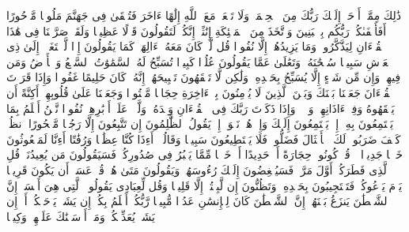 \stopbuffer%
\startbuffer[\q:17:39]
ذَٰلِكَ مِمَّاۤ أَوۡحَىٰۤ إِلَیۡكَ رَبُّكَ مِنَ ٱلۡحِكۡمَةِۗ وَلَا تَجۡعَلۡ مَعَ ٱللَّهِ إِلَٰهًا ءَاخَرَ فَتُلۡقَىٰ فِی جَهَنَّمَ مَلُومࣰا مَّدۡحُورًا%
\stopbuffer%
\startbuffer[\q:17:40]
أَفَأَصۡفَىٰكُمۡ رَبُّكُم بِٱلۡبَنِینَ وَٱتَّخَذَ مِنَ ٱلۡمَلَٰۤئِكَةِ إِنَٰثًاۚ إِنَّكُمۡ لَتَقُولُونَ قَوۡلًا عَظِیمࣰا%
\stopbuffer%
\startbuffer[\q:17:41]
وَلَقَدۡ صَرَّفۡنَا فِی هَٰذَا ٱلۡقُرۡءَانِ لِیَذَّكَّرُوا۟ وَمَا یَزِیدُهُمۡ إِلَّا نُفُورࣰا%
\stopbuffer%
\startbuffer[\q:17:42]
قُل لَّوۡ كَانَ مَعَهُۥۤ ءَالِهَةࣱ كَمَا یَقُولُونَ إِذࣰا لَّٱبۡتَغَوۡا۟ إِلَىٰ ذِی ٱلۡعَرۡشِ سَبِیلࣰا%
\stopbuffer%
\startbuffer[\q:17:43]
سُبۡحَٰنَهُۥ وَتَعَٰلَىٰ عَمَّا یَقُولُونَ عُلُوࣰّا كَبِیرࣰا%
\stopbuffer%
\startbuffer[\q:17:44]
تُسَبِّحُ لَهُ ٱلسَّمَٰوَٰتُ ٱلسَّبۡعُ وَٱلۡأَرۡضُ وَمَن فِیهِنَّۚ وَإِن مِّن شَیۡءٍ إِلَّا یُسَبِّحُ بِحَمۡدِهِۦ وَلَٰكِن لَّا تَفۡقَهُونَ تَسۡبِیحَهُمۡۚ إِنَّهُۥ كَانَ حَلِیمًا غَفُورࣰا%
\stopbuffer%
\startbuffer[\q:17:45]
وَإِذَا قَرَأۡتَ ٱلۡقُرۡءَانَ جَعَلۡنَا بَیۡنَكَ وَبَیۡنَ ٱلَّذِینَ لَا یُؤۡمِنُونَ بِٱلۡءَاخِرَةِ حِجَابࣰا مَّسۡتُورࣰا%
\stopbuffer%
\startbuffer[\q:17:46]
وَجَعَلۡنَا عَلَىٰ قُلُوبِهِمۡ أَكِنَّةً أَن یَفۡقَهُوهُ وَفِیۤ ءَاذَانِهِمۡ وَقۡرࣰاۚ وَإِذَا ذَكَرۡتَ رَبَّكَ فِی ٱلۡقُرۡءَانِ وَحۡدَهُۥ وَلَّوۡا۟ عَلَىٰۤ أَدۡبَٰرِهِمۡ نُفُورࣰا%
\stopbuffer%
\startbuffer[\q:17:47]
نَّحۡنُ أَعۡلَمُ بِمَا یَسۡتَمِعُونَ بِهِۦۤ إِذۡ یَسۡتَمِعُونَ إِلَیۡكَ وَإِذۡ هُمۡ نَجۡوَىٰۤ إِذۡ یَقُولُ ٱلظَّٰلِمُونَ إِن تَتَّبِعُونَ إِلَّا رَجُلࣰا مَّسۡحُورًا%
\stopbuffer%
\startbuffer[\q:17:48]
ٱنظُرۡ كَیۡفَ ضَرَبُوا۟ لَكَ ٱلۡأَمۡثَالَ فَضَلُّوا۟ فَلَا یَسۡتَطِیعُونَ سَبِیلࣰا%
\stopbuffer%
\startbuffer[\q:17:49]
وَقَالُوۤا۟ أَءِذَا كُنَّا عِظَٰمࣰا وَرُفَٰتًا أَءِنَّا لَمَبۡعُوثُونَ خَلۡقࣰا جَدِیدࣰا%
\stopbuffer%
\startbuffer[\q:17:50]
۞ قُلۡ كُونُوا۟ حِجَارَةً أَوۡ حَدِیدًا%
\stopbuffer%
\startbuffer[\q:17:51]
أَوۡ خَلۡقࣰا مِّمَّا یَكۡبُرُ فِی صُدُورِكُمۡۚ فَسَیَقُولُونَ مَن یُعِیدُنَاۖ قُلِ ٱلَّذِی فَطَرَكُمۡ أَوَّلَ مَرَّةࣲۚ فَسَیُنۡغِضُونَ إِلَیۡكَ رُءُوسَهُمۡ وَیَقُولُونَ مَتَىٰ هُوَۖ قُلۡ عَسَىٰۤ أَن یَكُونَ قَرِیبࣰا%
\stopbuffer%
\startbuffer[\q:17:52]
یَوۡمَ یَدۡعُوكُمۡ فَتَسۡتَجِیبُونَ بِحَمۡدِهِۦ وَتَظُنُّونَ إِن لَّبِثۡتُمۡ إِلَّا قَلِیلࣰا%
\stopbuffer%
\startbuffer[\q:17:53]
وَقُل لِّعِبَادِی یَقُولُوا۟ ٱلَّتِی هِیَ أَحۡسَنُۚ إِنَّ ٱلشَّیۡطَٰنَ یَنزَغُ بَیۡنَهُمۡۚ إِنَّ ٱلشَّیۡطَٰنَ كَانَ لِلۡإِنسَٰنِ عَدُوࣰّا مُّبِینࣰا%
\stopbuffer%
\startbuffer[\q:17:54]
رَّبُّكُمۡ أَعۡلَمُ بِكُمۡۖ إِن یَشَأۡ یَرۡحَمۡكُمۡ أَوۡ إِن یَشَأۡ یُعَذِّبۡكُمۡۚ وَمَاۤ أَرۡسَلۡنَٰكَ عَلَیۡهِمۡ وَكِیلࣰا%
\stopbuffer%
\startbuffer[\q:17:55]

